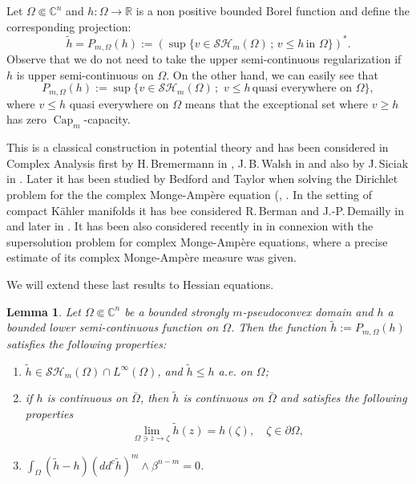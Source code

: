\documentclass[11pt]{article}
\providecommand{\C}{}
\numberwithin{equation}{section}
\newenvironment{enumeratei}
{\bgroup\def\theenumi{\roman{enumi}}\def\theenumii{\arabic{enumii}}\begin{enumerate}}
{\end{enumerate}\egroup}
\newcommand{\sep}{\,;\,}
\newtheorem{lemma}[theorem]{Lemma}
\theoremstyle{definition}
\newcommand{\R}{\mathbb{R}}
\renewcommand{\C}{\mathbb{C}}
\DeclareMathOperator{\Capa}{Cap}
\theoremstyle{plain}
\theoremstyle{definition}
\begin{document}
Let $\Omega \Subset \C^n$ and $h: \Omega \to \R$ is a non positive bounded Borel function and define the corresponding projection:
\begin{equation} \label{eq:subextension}
\tilde h = P_{m,\Omega} (h):= \left(\sup \{v \in \mathcal {SH}_m (\Omega) \sep v \leq h \, \text{in} \, \, \Omega\}\right)^*.
\end{equation}
Observe that we do not need to take the upper semi-continuous regularization if $h$ is upper semi-continuous on $\Omega$. On the other hand, we can easily see that
\[
P_{m,\Omega} (h):= \sup \{v \in \mathcal {SH}_m (\Omega) \sep \, v \leq h \, \text{quasi everywhere on} \, \, \Omega\},
\]
where $v \leq h$ quasi everywhere on $\Omega$ means that the exceptional set where $v \geq h$ has zero $\Capa_m$-capacity.

This is a classical construction in potential theory and has been considered in Complex Analysis first by H.\,Bremermann in \cite{Brem59}, J.\,B.\,Walsh in \cite{Wal69} and also by J.\,Siciak in \cite{Sic81}. Later it has been studied by Bedford and Taylor when solving the Dirichlet problem for the the complex Monge-Ampère equation (\cite{BT76}, \cite{BT82}. In the setting of compact Kähler manifolds it has bee considered R.\,Berman and J.-P.\,Demailly in \cite{BD12} and later in \cite{Ber19}. It has been also considered recently in \cite{GLZ19} in connexion with the supersolution problem for complex Monge-Ampère equations, where a precise estimate of its complex Monge-Ampère measure was given.

We will extend these last results to Hessian equations.

\begin{lemma} \label{lem:projection} Let $\Omega \Subset \C^n$ be a bounded strongly $m$-pseudoconvex domain and $h$ a bounded lower semi-continuous function on $\Omega$. Then the function $\tilde h:= P_{m,\Omega} (h)$ satisfies the following properties:
\begin{enumeratei}
\item\label{lem:projectioni}
$\tilde h \in \mathcal {SH}_m (\Omega) \cap L^{\infty} (\Omega)$, and $\tilde h \leq h$ a.e. on $\Omega$;

\item\label{lem:projectionii}
if $h$ is continuous on $\bar \Omega$, then $\tilde h$ is continuous on $\bar{\Omega}$ and satisfies the following properties
\begin{equation} \label{eq:boundaryvaluesh}
\lim_{\Omega \ni z \to \zeta} \tilde h (z) = h (\zeta), \quad \zeta \in \partial \Omega,
\end{equation}

\item\label{lem:projectioniii}
$ \int_\Omega (\tilde h - h) (dd^c \tilde h)^m \wedge \beta^{n - m} = 0$.
\end{enumeratei}
\end{lemma}
\end{document}
